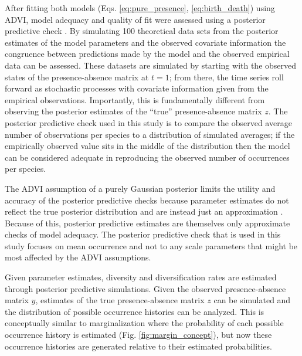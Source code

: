 \documentclass[12pt,letterpaper]{article}
\begin{document}
After fitting both models (Eqs. \ref{eq:pure_presence}, \ref{eq:birth_death}) using ADVI, model adequacy and quality of fit were assessed using a posterior predictive check \citep{Gelman2013d}. By simulating 100 theoretical data sets from the posterior estimates of the model parameters and the observed covariate information the congruence between predictions made by the model and the observed empirical data can be assessed. These datasets are simulated by starting with the observed states of the presence-absence matrix at \(t = 1\); from there, the time series roll forward as stochastic processes with covariate information given from the empirical observations. Importantly, this is fundamentally different from observing the posterior estimates of the ``true'' presence-absence matrix \(z\). The posterior predictive check used in this study is to compare the observed average number of observations per species to a distribution of simulated averages; if the empirically observed value sits in the middle of the distribution then the model can be considered adequate in reproducing the observed number of occurrences per species. 

The ADVI assumption of a purely Gaussian posterior limits the utility and accuracy of the posterior predictive checks because parameter estimates do not reflect the true posterior distribution and are instead just an approximation \citep{Gelman2013d}. Because of this, posterior predictive estimates are themselves only approximate checks of model adequacy. The posterior predictive check that is used in this study focuses on mean occurrence and not to any scale parameters that might be most affected by the ADVI assumptions.


Given parameter estimates, diversity and diversification rates are estimated through posterior predictive simulations. Given the observed presence-absence matrix \(y\), estimates of the true presence-absence matrix \(z\) can be simulated and the distribution of possible occurrence histories can be analyzed. This is conceptually similar to marginalization where the probability of each possible occurrence history is estimated (Fig. \ref{fig:margin_concept}), but now these occurrence histories are generated relative to their estimated probabilities.
\end{document}
